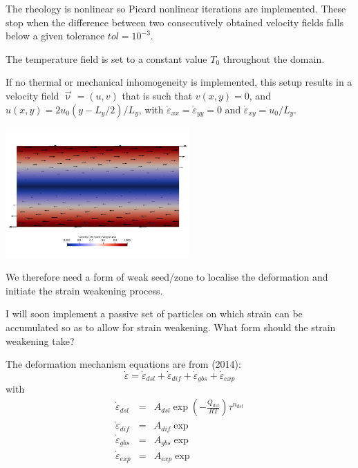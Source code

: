 The rheology is nonlinear so Picard nonlinear iterations are implemented. These stop
when the difference between two consecutively obtained velocity fields falls below
a given tolerance $tol=10^{-3}$. 

The temperature field is set to a constant value $T_0$ throughout the domain.

If no thermal or mechanical inhomogeneity is implemented, this setup results in 
a velocity field $\vec{\upnu}=(u,v)$ that is such that $v(x,y)=0$, and 
$u(x,y)=2u_0 (y-L_y/2)/L_y$, with $\dot{\varepsilon}_{xx}=\dot{\varepsilon}_{yy}=0$ 
and $\dot{\varepsilon}_{xy}=u_0/L_y$. 

\begin{center}
\includegraphics[width=7cm]{python_codes/fieldstone_121/results/vel}
\end{center}

We therefore need a form of weak seed/zone to localise the deformation and 
initiate the strain weakening process.

I will soon implement a passive set of particles on which strain can be accumulated so as 
to allow for strain weakening. What form should the strain weakening take?


\newpage

The deformation mechanism equations are from \textcite{gupr14} (2014):
\[
\dot\varepsilon = \dot\varepsilon_{dsl} + \dot\varepsilon_{dif} + \dot\varepsilon_{gbs} + \dot\varepsilon_{exp} 
\]
with
\begin{eqnarray}
\dot\varepsilon_{dsl} &=& A_{dsl} \exp \left(-\frac{Q_{dsl}}{RT} \right)  \tau^{n_{dsl}}  \\
\dot\varepsilon_{dif} &=& A_{dif} \exp    \\
\dot\varepsilon_{gbs} &=& A_{gbs} \exp    \\
\dot\varepsilon_{exp} &=& A_{exp} \exp    
\end{eqnarray}





